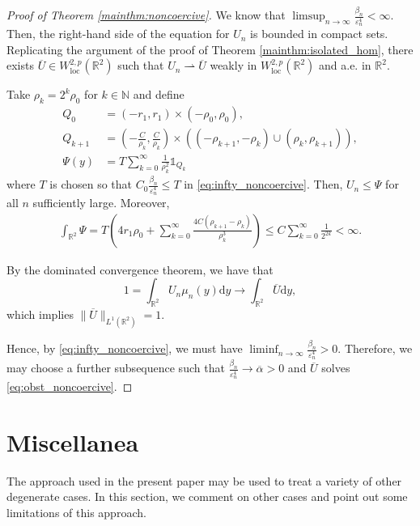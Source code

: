 \documentclass[10pt,a4paper]{article}
\newcommand{\loc}{\mathrm{loc}}
\newcommand{\NN}{\mathbb{N}}
\newcommand{\RR}{\mathbb{R}}
\numberwithin{equation}{section}
\begin{document}
\begin{proof}[Proof of Theorem \ref{mainthm:noncoercive}]
	We know that $ \limsup_{n\rightarrow \infty} \frac{\beta_n}{\varepsilon_n^{4}} < \infty $. Then, the right-hand side of the equation for $ U_n $ is bounded in compact sets. Replicating the argument of the proof of Theorem \ref{mainthm:isolated_hom}, there exists $ \overline{U} \in W^{2,p}_{\loc}(\RR^{2}) $ such that $ U_n \rightharpoonup \overline{U} $ weakly in $ W^{2,p}_\loc(\RR^{2}) $ and a.e. in $ \RR^{2} $.
	
	Take $ \rho_k = 2^k \rho_0 $ for $ k\in \NN $ and define 
	\begin{align*}
		Q_0 &= (-r_1, r_1) \times (-\rho_0, \rho_0), \\ 
		Q_{k+1} &= \left( -\frac{C}{\rho_k}, \frac{C}{\rho_k} \right) \times ((-\rho_{k+1}, -\rho_k) \cup (\rho_k, \rho_{k+1})), \\
		\Psi(y) &= T \sum_{k=0}^{\infty}\frac{1}{\rho_k^2} \mathbb{1}_{Q_k} 
	\end{align*}
	where $ T $ is chosen so that $ C_0 \frac{\beta_n}{\varepsilon_n^{4}} \leq T$ in \eqref{eq:infty_noncoercive}. Then, $ U_n \leq \Psi $ for all $ n $ sufficiently large. Moreover, 
	\begin{align*}
	\int_{\RR^{2}} \Psi = T \left( 4r_1\rho_0 + \sum_{k=0}^{\infty}\frac{4C(\rho_{k+1} - \rho_k)}{\rho_k^{3}} \right) \leq C \sum_{k=0}^{\infty} \frac{1}{2^{2k}} < \infty.
	\end{align*}

	By the dominated convergence theorem, we have that 
	\[ 
		1 = \int_{\RR^{2}} U_n \mu_n(y) \mathrm{d}y \rightarrow \int_{\RR^{2}} \overline{U} \mathrm{d}y,
	\]
	which implies $\| \overline{U} \|_{L^{1}(\RR^{2})} = 1$. 

		Hence, by \eqref{eq:infty_noncoercive}, we must have $ \liminf_{n\rightarrow \infty} \frac{\beta_n}{\varepsilon_n^{4}} > 0 $. Therefore, we may choose a further subsequence such that $ \frac{\beta_n}{\varepsilon_n^{4}} \rightarrow \overline{\alpha} > 0 $ and $ \overline{U} $ solves \eqref{eq:obst_noncoercive}.  
	\end{proof}

	\section{Miscellanea}
	\label{sect:misc}

	The approach used in the present paper may be used to treat a variety of other degenerate cases. In this section, we comment on other cases and point out some limitations of this approach.
\end{document}
